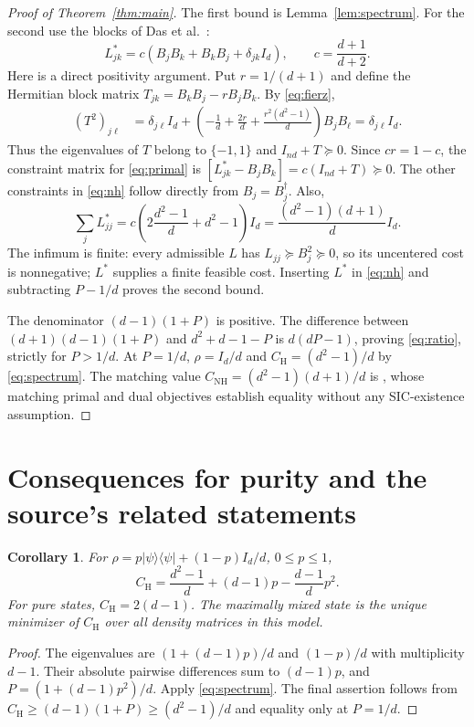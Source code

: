 \documentclass[11pt]{article}
\newcommand{\Id}{I}
\newcommand{\CH}{C_{\mathrm H}}
\newcommand{\CN}{C_{\mathrm{NH}}}
\newtheorem{corollary}[theorem]{Corollary}
\begin{document}
\begin{proof}[Proof of Theorem~\ref{thm:main}]
The first bound is Lemma~\ref{lem:spectrum}.
For the second use the blocks of Das et al.\ \cite[Eq.~(37), Appendix~E.2]{Das}:
\begin{equation}\label{eq:primal}
 L^*_{jk}=c(B_jB_k+B_kB_j+\delta_{jk}\Id_d),
 \qquad c=\frac{d+1}{d+2}.
\end{equation}
Here is a direct positivity argument. Put $r=1/(d+1)$ and define the
Hermitian block matrix $T_{jk}=B_kB_j-rB_jB_k$. By \eqref{eq:fierz},
\begin{align*}
 (T^2)_{j\ell}
 &=\delta_{j\ell}\Id_d+
 \left(-\frac1d+\frac{2r}{d}+\frac{r^2(d^2-1)}d\right)B_jB_\ell
 =\delta_{j\ell}\Id_d.
\end{align*}
Thus the eigenvalues of $T$ belong to $\{-1,1\}$ and $\Id_{nd}+T\succeq0$.
Since $cr=1-c$, the constraint matrix for \eqref{eq:primal} is
$[L^*_{jk}-B_jB_k]=c(\Id_{nd}+T)\succeq0$.
The other constraints in \eqref{eq:nh} follow directly from
$B_j=B_j^{\dagger}$. Also,
\[
 \sum_j L^*_{jj}
 =c\left(2\frac{d^2-1}{d}+d^2-1\right)\Id_d
 =\frac{(d^2-1)(d+1)}d\Id_d.
\]
The infimum is finite: every admissible $L$ has
$L_{jj}\succeq B_j^2\succeq0$, so its uncentered cost is nonnegative;
$L^*$ supplies a finite feasible cost. Inserting $L^*$ in
\eqref{eq:nh} and subtracting $P-1/d$ proves the second bound.

The denominator $(d-1)(1+P)$ is positive. The difference between
$(d+1)(d-1)(1+P)$ and $d^2+d-1-P$ is $d(dP-1)$, proving
\eqref{eq:ratio}, strictly for $P>1/d$. At $P=1/d$,
$\rho=\Id_d/d$ and $\CH=(d^2-1)/d$ by \eqref{eq:spectrum}.
The matching value $\CN=(d^2-1)(d+1)/d$ is
\cite[Lemma~3, Eq.~(38), Appendix~E.3--E.4]{Das}, whose matching primal
and dual objectives establish equality without any SIC-existence assumption.
\end{proof}

\section{Consequences for purity and the source's related statements}
\begin{corollary}\label{cor:depolarized}
For $\rho=p|\psi\rangle\langle\psi|+(1-p)\Id_d/d$, $0\leq p\leq1$,
\[
 \CH=\frac{d^2-1}{d}+(d-1)p-\frac{d-1}{d}p^2.
\]
For pure states, $\CH=2(d-1)$. The maximally mixed state is the unique
minimizer of $\CH$ over all density matrices in this model.
\end{corollary}
\begin{proof}
The eigenvalues are $(1+(d-1)p)/d$ and $(1-p)/d$ with multiplicity $d-1$.
Their absolute pairwise differences sum to $(d-1)p$, and
$P=(1+(d-1)p^2)/d$. Apply \eqref{eq:spectrum}.
The final assertion follows from
$\CH\geq(d-1)(1+P)\geq(d^2-1)/d$ and equality only at $P=1/d$.
\end{proof}
\end{document}
